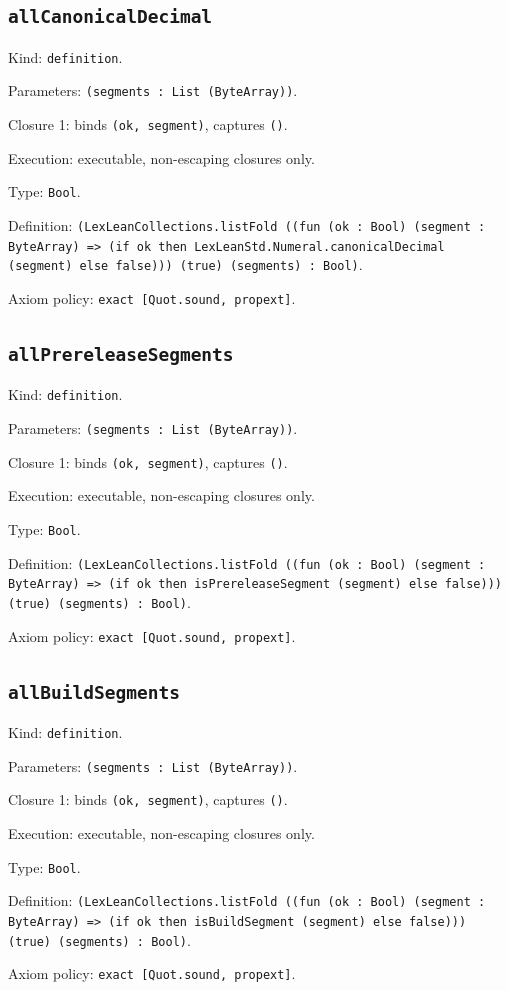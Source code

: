 \documentclass[11pt]{article}
\begin{document}
\subsection*{\texttt{allCanonicalDecimal}}
\noindent Kind: \texttt{definition}.\par
\noindent Parameters: \texttt{(segments : List (ByteArray))}.\par
\noindent Closure 1: binds \texttt{(ok, segment)}, captures \texttt{()}.\par
\noindent Execution: executable, non-escaping closures only.\par
\noindent Type: \texttt{Bool}.\par
\noindent Definition: \texttt{(LexLeanCollections.listFold ((fun (ok : Bool) (segment : ByteArray) => (if ok then LexLeanStd.Numeral.canonicalDecimal (segment) else false))) (true) (segments) : Bool)}.\par
\noindent Axiom policy: \texttt{exact [Quot.sound, propext]}.\par
\subsection*{\texttt{allPrereleaseSegments}}
\noindent Kind: \texttt{definition}.\par
\noindent Parameters: \texttt{(segments : List (ByteArray))}.\par
\noindent Closure 1: binds \texttt{(ok, segment)}, captures \texttt{()}.\par
\noindent Execution: executable, non-escaping closures only.\par
\noindent Type: \texttt{Bool}.\par
\noindent Definition: \texttt{(LexLeanCollections.listFold ((fun (ok : Bool) (segment : ByteArray) => (if ok then isPrereleaseSegment (segment) else false))) (true) (segments) : Bool)}.\par
\noindent Axiom policy: \texttt{exact [Quot.sound, propext]}.\par
\subsection*{\texttt{allBuildSegments}}
\noindent Kind: \texttt{definition}.\par
\noindent Parameters: \texttt{(segments : List (ByteArray))}.\par
\noindent Closure 1: binds \texttt{(ok, segment)}, captures \texttt{()}.\par
\noindent Execution: executable, non-escaping closures only.\par
\noindent Type: \texttt{Bool}.\par
\noindent Definition: \texttt{(LexLeanCollections.listFold ((fun (ok : Bool) (segment : ByteArray) => (if ok then isBuildSegment (segment) else false))) (true) (segments) : Bool)}.\par
\noindent Axiom policy: \texttt{exact [Quot.sound, propext]}.\par
\end{document}
